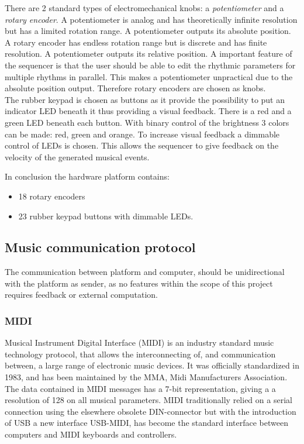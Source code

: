 There are 2 standard types of electromechanical knobs: a \textit{potentiometer} and a \textit{rotary encoder}. A potentiometer is analog and has theoretically infinite resolution but has a limited rotation range. A potentiometer outputs its absolute position. A rotary encoder has endless rotation range but is discrete and has finite resolution. A potentiometer outputs its relative position. A important feature of the sequencer is that the user should be able to edit the rhythmic parameters for multiple rhythms in parallel. This 
makes a potentiometer unpractical due to the absolute position output. Therefore rotary encoders are chosen as knobs.\\
The rubber keypad is chosen as buttons as it provide the possibility to put an indicator LED beneath it thus providing a visual feedback. There is a red and a green LED beneath each button. With binary control of the brightness 3 colors can be made: red, green and orange. To increase visual feedback a dimmable control of LEDs is chosen. This allows the sequencer to give feedback on the velocity of the generated musical events.

\noindent In conclusion the hardware platform contains:
\begin{itemize}
    \item 18 rotary encoders
    \item 23 rubber keypad buttons with dimmable LEDs.
\end{itemize}

\subsection{Music communication protocol}
\label{sec:musiccommunicationprotocol}

The communication between platform and computer, should be unidirectional with the platform as sender, as no features within the scope of this project requires feedback or external computation.

\subsubsection{MIDI}
Musical Instrument Digital Interface (MIDI) is an industry standard music technology protocol, that allows the interconnecting of, and communication between, a large range of electronic music devices. It was officially standardized in 1983, and has been maintained by the MMA, Midi Manufacturers Association.\cite{midi} \\
The data contained in MIDI messages has a 7-bit representation, giving a a resolution of 128 on all musical parameters. MIDI traditionally relied on a serial connection using the elsewhere obsolete DIN-connector but with the introduction of USB a new interface USB-MIDI, has become the standard interface between computers and MIDI keyboards and controllers.\cite{website:midiusb}

